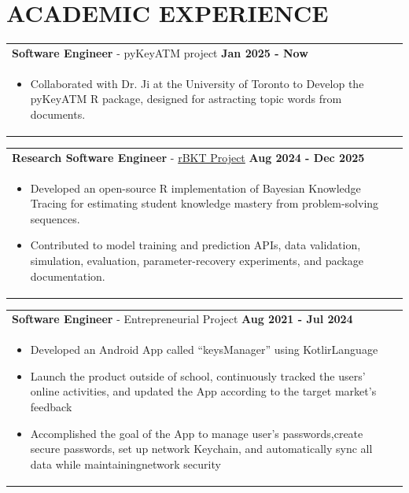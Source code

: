 \documentclass[a4paper,11pt]{article}
\begin{document}
\section{\textbf{ACADEMIC EXPERIENCE}}

\begin{tabularx}{\linewidth}{ @{}l r@{} }
    \textbf{Software Engineer} - pyKeyATM project \hfill \textbf{Jan 2025 - Now} \\[4pt]
    \begin{minipage}[t]{\linewidth}
        \begin{itemize}[nosep,after=\strut, leftmargin=1em, itemsep=2pt]
            \item Collaborated with Dr. Ji at the University of Toronto to Develop the pyKeyATM R package, designed for astracting topic words from documents.
        \end{itemize}
    \end{minipage}
    \end{tabularx}

\begin{tabularx}{\linewidth}{ @{}l r@{} }
    \textbf{Research Software Engineer} - \href{https://github.com/Feng-Ji-Lab/BKT}{rBKT Project} \hfill \textbf{Aug 2024 - Dec 2025} \\[4pt]
    \begin{minipage}[t]{\linewidth}
        \begin{itemize}[nosep,after=\strut, leftmargin=1em, itemsep=2pt]
            \item Developed an open-source R implementation of Bayesian Knowledge Tracing for estimating student knowledge mastery from problem-solving sequences.
            \item Contributed to model training and prediction APIs, data validation, simulation, evaluation, parameter-recovery experiments, and package documentation.
        \end{itemize}
    \end{minipage}
    \end{tabularx}

\begin{tabularx}{\linewidth}{ @{}l r@{} }
\textbf{Software Engineer} - Entrepreneurial Project \hfill \textbf{Aug 2021 - Jul 2024} \\[4pt]
\begin{minipage}[t]{\linewidth}
    \begin{itemize}[nosep,after=\strut, leftmargin=1em, itemsep=2pt]
        \item Developed an Android App called “keysManager” using KotlirLanguage
        \item Launch the product outside of school, continuously tracked the users' online activities, and updated the
        App according to the target market's feedback
        \item Accomplished the goal of the App to manage user's passwords,create secure passwords, set up network
        Keychain, and automatically sync all data while maintainingnetwork security
    \end{itemize}
\end{minipage}
\end{tabularx}
\end{document}

